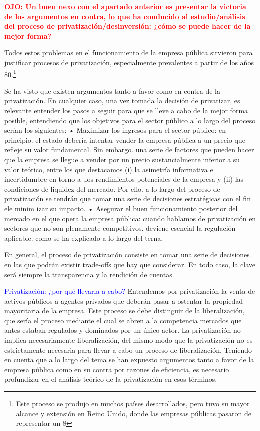 \documentclass[10pt,a4paper]{article}
\begin{document}
\textcolor{red}{\textbf{OJO: Un buen nexo con el apartado anterior es presentar la victoria de los argumentos en contra, lo que ha conducido al estudio/análisis del proceso de privatización/desinversión: ¿cómo se puede hacer de la mejor forma?}}

Todos estos problemas en el funcionamiento de la empresa pública sirvieron para justificar procesos de privatización, especialmente prevalentes a partir de los años 80.\footnote{%
    Este proceso se produjo en muchos países desarrollados, pero tuvo su mayor alcance y extensión en Reino Unido, donde las empresas públicas pasaron de representar un 8%
} 

Se ha visto que existen argumentos tanto a favor como en contra de la privatización. En cualquier caso, una vez tomada la decisión de privatizar, es relevante entender los pasos a seguir para que se lleve a cabo de la mejor forma posible, entendiendo que los objetivos para el sector público a lo largo del proceso serían los siguientes:
• Maximizar los ingresos para el sector público: en principio. el estado debería intentar vender la empresa pública a un precio que refleje su valor fundamental. Sin embargo. una serie de factores que pueden hacer que la empresa se llegue a vender por un precio sustancialmente inferior a su valor teórico, entre los que destacamos (i) la asimetría informativa e incertidumbre en torno a .los rendimientos potenciales de la empresa y (ii) las condiciones de liquidez del mercado. Por ello. a lo largo del proceso de privatización se tendrán que tomar una serie de decisiones estratégicas con el fin ele minim izar su impacto.
• Asegurar el buen funcionamiento posterior del mercado en el que opera la empresa pública: cuando hablamos de privatización en sectores que no son plenamente competitivos. deviene esencial la regulación aplicable. como se ha explicado a lo largo del terna.

En general, el proceso de privatización consiste en tomar una serie de decisiones en las que podrán existir trade-offs que hay que considerar. En todo caso, la clave será siempre la transparencia y la rendición de cuentas.


\textcolor{blue}{Privatización: ¿por qué llevarla a cabo?}
Entendemos por privatización la venta de activos públicos a agentes privados que deberán pasar a ostentar la propiedad mayoritaria de la empresa. Este proceso se debe distinguir de la liberalización, que sería el proceso mediante el cual se abren a la competencia mercados que antes estaban regulados y dominados por un único actor. La privatización no implica necesariamente liberalización, del mismo modo que la privatización no es estrictamente necesaria para llevar a cabo un proceso de liberalización. Teniendo en cuenta que a lo largo del tema se han expuesto argumentos tanto a favor de la empresa pública como en su contra por razones de eficiencia, es necesario profundizar en el análisis teórico de la privatización en esos términos.
\end{document}
